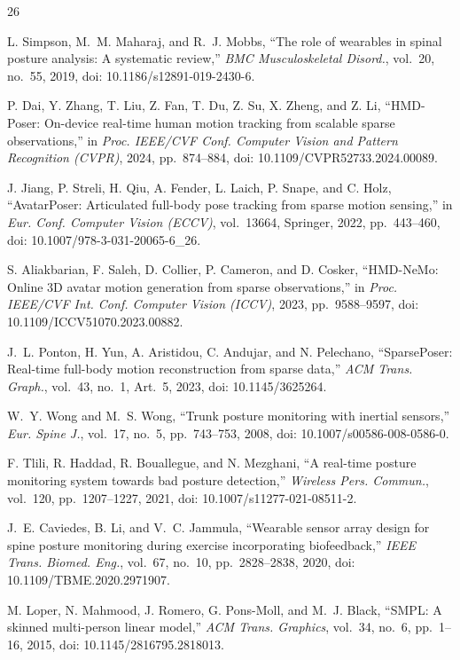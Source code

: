 \documentclass[conference]{IEEEtran}
\begin{document}
\begin{thebibliography}{26}

L. Simpson, M.~M. Maharaj, and R.~J. Mobbs,
``The role of wearables in spinal posture analysis: A systematic review,''
\textit{BMC Musculoskeletal Disord.}, vol.~20, no.~55, 2019,
doi: 10.1186/s12891-019-2430-6.

P. Dai, Y. Zhang, T. Liu, Z. Fan, T. Du, Z. Su, X. Zheng, and Z. Li,
``HMD-Poser: On-device real-time human motion tracking from scalable sparse observations,''
in \textit{Proc. IEEE/CVF Conf. Computer Vision and Pattern Recognition (CVPR)},
2024, pp.~874--884,
doi: 10.1109/CVPR52733.2024.00089.

J. Jiang, P. Streli, H. Qiu, A. Fender, L. Laich, P. Snape, and C. Holz,
``AvatarPoser: Articulated full-body pose tracking from sparse motion sensing,''
in \textit{Eur. Conf. Computer Vision (ECCV)}, vol.~13664, Springer, 2022, pp.~443--460,
doi: 10.1007/978-3-031-20065-6\_26.

S. Aliakbarian, F. Saleh, D. Collier, P. Cameron, and D. Cosker,
``HMD-NeMo: Online 3D avatar motion generation from sparse observations,''
in \textit{Proc. IEEE/CVF Int. Conf. Computer Vision (ICCV)}, 2023, pp.~9588--9597,
doi: 10.1109/ICCV51070.2023.00882.

J.~L. Ponton, H. Yun, A. Aristidou, C. Andujar, and N. Pelechano,
``SparsePoser: Real-time full-body motion reconstruction from sparse data,''
\textit{ACM Trans. Graph.}, vol.~43, no.~1, Art.~5, 2023,
doi: 10.1145/3625264.

W.~Y. Wong and M.~S. Wong,
``Trunk posture monitoring with inertial sensors,''
\textit{Eur. Spine J.}, vol.~17, no.~5, pp.~743--753, 2008,
doi: 10.1007/s00586-008-0586-0.

F. Tlili, R. Haddad, R. Bouallegue, and N. Mezghani,
``A real-time posture monitoring system towards bad posture detection,''
\textit{Wireless Pers. Commun.}, vol.~120, pp.~1207--1227, 2021,
doi: 10.1007/s11277-021-08511-2.

J.~E. Caviedes, B. Li, and V.~C. Jammula,
``Wearable sensor array design for spine posture monitoring during exercise incorporating
biofeedback,''
\textit{IEEE Trans. Biomed. Eng.}, vol.~67, no.~10, pp.~2828--2838, 2020,
doi: 10.1109/TBME.2020.2971907.

M. Loper, N. Mahmood, J. Romero, G. Pons-Moll, and M.~J. Black,
``SMPL: A skinned multi-person linear model,''
\textit{ACM Trans. Graphics}, vol.~34, no.~6, pp.~1--16, 2015,
doi: 10.1145/2816795.2818013.


\end{thebibliography}
\end{document}
